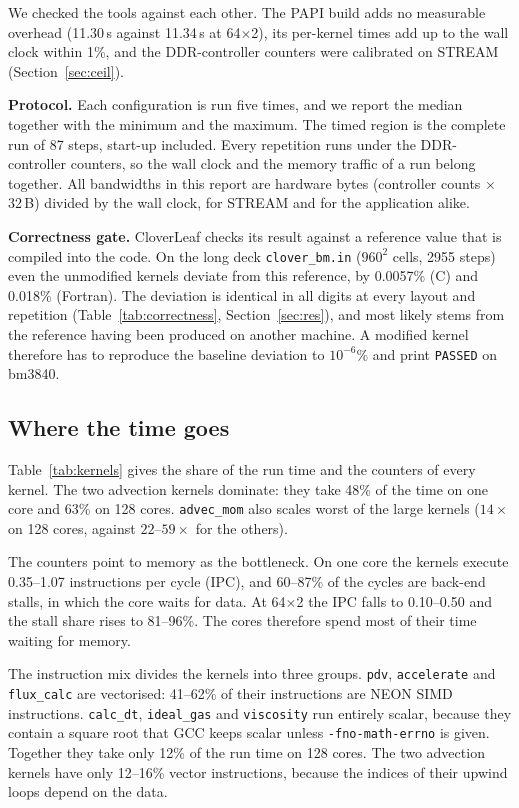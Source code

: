 \documentclass[a4paper,11pt]{article}
\newcommand{\kernel}[1]{\texttt{#1}}
\begin{document}
We checked the tools against each other. The PAPI build adds no measurable overhead (11.30\,s against
11.34\,s at 64$\times$2), its per-kernel times add up to the wall clock within 1\%, and the DDR-controller
counters were calibrated on STREAM (Section~\ref{sec:ceil}).

\textbf{Protocol.} Each configuration is run five times, and we report the median together with the minimum
and the maximum. The timed region is the complete run of 87 steps, start-up included. Every repetition runs
under the DDR-controller counters, so the wall clock and the memory traffic of a run belong together. All
bandwidths in this report are hardware bytes (controller counts $\times$ 32\,B) divided by the wall clock,
for STREAM and for the application alike.

\textbf{Correctness gate.} CloverLeaf checks its result against a reference value that is compiled into the
code. On the long deck \texttt{clover\_bm.in} ($960^2$ cells, 2955 steps) even the unmodified kernels deviate
from this reference, by 0.0057\% (C) and 0.018\% (Fortran). The deviation is identical in all digits at every
layout and repetition (Table~\ref{tab:correctness}, Section~\ref{sec:res}), and most likely stems from the
reference having been produced on another machine. A modified kernel therefore has to reproduce the baseline
deviation to $10^{-6}$\% and print \texttt{PASSED} on bm3840.

\subsection{Where the time goes}
\label{sec:time}
Table~\ref{tab:kernels} gives the share of the run time and the counters of every kernel. The two advection
kernels dominate: they take 48\% of the time on one core and 63\% on 128 cores. \kernel{advec\_mom} also
scales worst of the large kernels ($14\times$ on 128 cores, against $22$--$59\times$ for the others).

The counters point to memory as the bottleneck. On one core the kernels execute 0.35--1.07 instructions per
cycle (IPC), and 60--87\% of the cycles are back-end stalls, in which the core waits for data. At 64$\times$2
the IPC falls to 0.10--0.50 and the stall share rises to 81--96\%. The cores therefore spend most of their
time waiting for memory.

The instruction mix divides the kernels into three groups. \kernel{pdv}, \kernel{accelerate} and
\kernel{flux\_calc} are vectorised: 41--62\% of their instructions are NEON SIMD instructions.
\kernel{calc\_dt}, \kernel{ideal\_gas} and \kernel{viscosity} run entirely scalar, because they contain a
square root that GCC keeps scalar unless \texttt{-fno-math-errno} is given. Together they take only 12\% of
the run time on 128 cores. The two advection kernels have only 12--16\% vector instructions, because the
indices of their upwind loops depend on the data.
\end{document}
